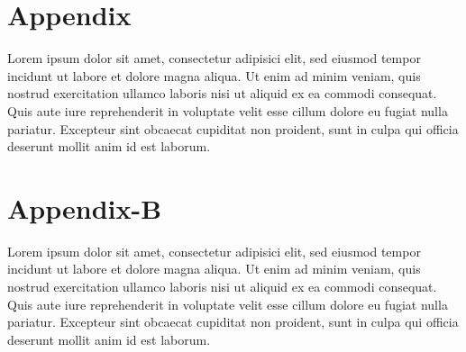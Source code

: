 
\appendix
\chapter{Appendix}
Lorem ipsum dolor sit amet, consectetur adipisici elit, sed eiusmod tempor incidunt ut labore et dolore magna aliqua. Ut enim ad minim veniam, quis nostrud exercitation ullamco laboris nisi ut aliquid ex ea commodi consequat. Quis aute iure reprehenderit in voluptate velit esse cillum dolore eu fugiat nulla pariatur. Excepteur sint obcaecat cupiditat non proident, sunt in culpa qui officia deserunt mollit anim id est laborum.


\chapter{Appendix-B}
Lorem ipsum dolor sit amet, consectetur adipisici elit, sed eiusmod tempor incidunt ut labore et dolore magna aliqua. Ut enim ad minim veniam, quis nostrud exercitation ullamco laboris nisi ut aliquid ex ea commodi consequat. Quis aute iure reprehenderit in voluptate velit esse cillum dolore eu fugiat nulla pariatur. Excepteur sint obcaecat cupiditat non proident, sunt in culpa qui officia deserunt mollit anim id est laborum.